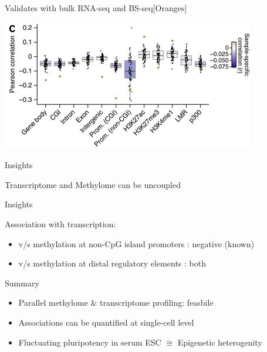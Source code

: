 \documentclass[10pt, compress]{beamer}
\renewcommand{\(}{\begin{columns}}
\renewcommand{\)}{\end{columns}}
\newcommand{\<}[1]{\begin{column}{#1}}
\renewcommand{\>}{\end{column}}
\begin{document}
\begin{frame}
	
		\begin{center} \Large Validates with bulk RNA-seq and BS-seq[Oranges]	\end{center}
	\begin{center}
		\includegraphics[width=\linewidth,height=\textheight,keepaspectratio]{images/corr2}
	\end{center}
\end{frame}

\begin{frame}[fragile]
	\begin{center} \Huge Insights \end{center}
	
 	\centering \Large Transcriptome and Methylome can be uncoupled
	
\end{frame}

\begin{frame}[fragile]
	\begin{center}	 \Huge Insights \end{center}
\Large Association with transcription: \begin{itemize}
	\item v/s methylation at non-CpG island promoters : negative (known)
	\item v/s methylation at distal regulatory elements : both
\end{itemize}
\end{frame}



\begin{frame}[fragile]
	\centering \Huge Summary
\Large \begin{itemize}
		\item Parallel methylome \& transcriptome profiling: feasbile
		\item Associations can be quantified at single-cell level
		\item Fluctuating pluripotency in serum ESC $\cong$ Epigenetic heterogenity
	\end{itemize}
\end{frame}
\end{document}
